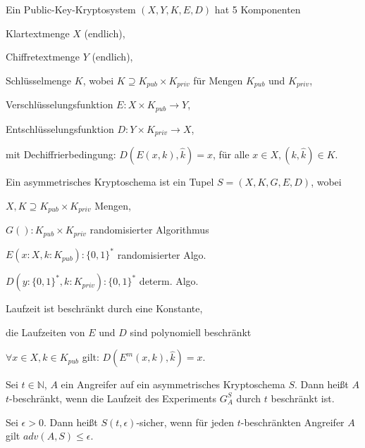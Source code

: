 \documentclass[avery5371, frame]{flashcards}
\begin{document}
\begin{flashcard}{Ein Public-Key-Kryptosystem $(X,Y,K,E,D)$ hat 5 Komponenten}
    \begin{itemize*}
        \item Klartextmenge $X$ (endlich),
        \item Chiffretextmenge $Y$ (endlich),
        \item Schlüsselmenge $K$, wobei $K\supseteq K_{pub} \times K_{priv}$ für Mengen $K_{pub}$ und $K_{priv}$,
        \item Verschlüsselungsfunktion $E:X\times K_{pub} \rightarrow Y$,
        \item Entschlüsselungsfunktion $D:Y\times K_{priv} \rightarrow X$,
        \item mit Dechiffrierbedingung: $D(E(x,k), \hat{k}) =x$, für alle $x\in X,(k,\hat{k})\in K$.
    \end{itemize*}
\end{flashcard}

\begin{flashcard}{Ein asymmetrisches Kryptoschema ist ein Tupel $S= (X,K,G,E,D)$, wobei}
    \begin{itemize*}
        \item $X,K\supseteq K_{pub} \times K_{priv}$ Mengen,
        \item $G():K_{pub} \times K_{priv}$ randomisierter Algorithmus
        \item $E(x:X,k:K_{pub}):\{0,1\}^*$ randomisierter Algo.
        \item $D(y:\{0,1\}^*,k:K_{priv}):\{0,1\}^*$ determ. Algo.
        \item Laufzeit ist beschränkt durch eine Konstante,
        \item die Laufzeiten von $E$ und $D$ sind polynomiell beschränkt
        \item $\forall x\in X,k\in K_{pub}$ gilt: $D(E^m (x,k),\hat{k}) =x$.
    \end{itemize*}
\end{flashcard}

\begin{flashcard}{ Sei $t\in\mathbb{N}$, $A$ ein Angreifer auf ein asymmetrisches Kryptoschema $S$. Dann heißt $A$ $t$-beschränkt, wenn }
    die Laufzeit des Experiments $G^S_A$ durch $t$ beschränkt ist.
\end{flashcard}

\begin{flashcard}{Sei $\epsilon >0$. Dann heißt $S(t,\epsilon)$-sicher, wenn }
    für jeden $t$-beschränkten Angreifer $A$ gilt $adv(A,S)\leq \epsilon$.
\end{flashcard}
\end{document}
